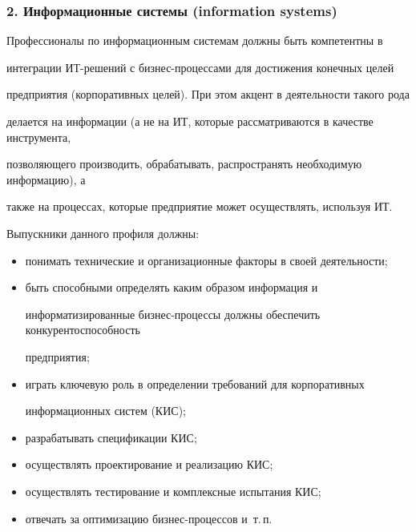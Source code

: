       \subsubsection*{2. Информационные системы (information systems)}

      

      Профессионалы по информационным системам должны быть компетентны в 

интеграции ИТ-решений с бизнес-процессами для достижения конечных целей 

предприятия (корпоративных целей). При этом акцент в деятельности такого рода 

делается на информации (а не на ИТ, которые рассматриваются в качестве инструмента, 

позволяющего производить, обрабатывать, распространять необходимую информацию), а 

также на процессах, которые предприятие может осуществлять, используя ИТ.

      

      Выпускники данного профиля должны:

      \begin{itemize}

\item понимать технические и организационные факторы в своей деятельности;

\item быть способными определять каким образом информация и 

информатизированные бизнес-процессы должны обеспечить конкурентоспособность 

предприятия;

\item играть ключевую роль в определении требований для корпоративных 

информационных систем (КИС);

\item разрабатывать спецификации КИС;

\item осуществлять проектирование и реализацию КИС;

\item осуществлять тестирование и комплексные испытания КИС;

\item отвечать за оптимизацию бизнес-процессов и~т.\,п.

\end{itemize}



